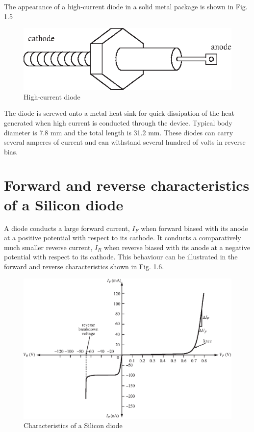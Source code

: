 The appearance of a high-current diode in a solid metal package is
shown in Fig. 1.5
\begin{figure}[H]
\centering
\includegraphics[scale=1.15]{chap1/S3-EE-01-005.eps}
\caption{High-current diode}\label{fig1.5}
\end{figure}

The diode is screwed onto a metal heat sink for quick dissipation of
the heat generated when high current is conducted through the
device. Typical body diameter is 7.8 mm and the total length is 31.2
mm. These diodes can carry several amperes of current and can
withstand several hundred of volts in reverse bias.\\[-20pt]

\section{Forward and reverse characteristics of a Silicon diode}\label{sec1.7}

A diode conducts a large forward current, $I_F$ when forward biased
with its anode at a positive potential with respect to its cathode. It
conducts a comparatively much smaller reverse current, $I_R$ when
reverse biased with its anode at a negative potential with respect to
its cathode. This behaviour can be illustrated in the forward and
reverse characteristics shown in Fig. 1.6.
\begin{figure}[H]
\centering
\includegraphics[scale=.9]{chap1/S3-EE-01-006.eps}
\caption{Characteristics of a Silicon diode}\label{fig1.6}
\end{figure}

